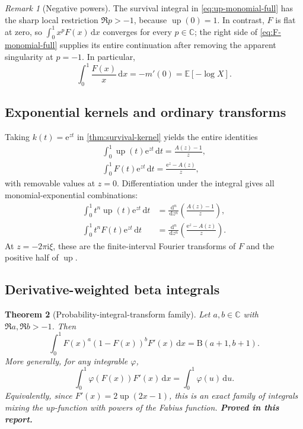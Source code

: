 \documentclass[11pt,oneside]{article}
\numberwithin{equation}{section}
\newtheorem{theorem}{Theorem}[section]
\theoremstyle{definition}
\theoremstyle{remark}
\newtheorem{remark}[theorem]{Remark}
\newcommand{\C}{\mathbb C}
\newcommand{\Up}{\operatorname{up}}
\newcommand{\e}{\mathrm e}
\newcommand{\ii}{\mathrm i}
\newcommand{\dd}{\,\mathrm d}
\newcommand{\E}{\mathbb E}
\newcommand{\statusproved}{\textcolor{proofgreen}{\textbf{Proved in this report.}}}
\begin{document}
\begin{remark}[Negative powers]
The survival integral in \eqref{eq:up-monomial-full} has the sharp local
restriction \(\Re p>-1\), because \(\Up(0)=1\).  In contrast, \(F\) is flat at
zero, so \(\int_0^1x^pF(x)\dd x\) converges for every \(p\in\C\); the right side
of \eqref{eq:F-monomial-full} supplies its entire continuation after removing
the apparent singularity at \(p=-1\).  In particular,
\begin{equation}
 \int_0^1\frac{F(x)}x\dd x=-m'(0)=\E[-\log X].
 \label{eq:F-over-x}
\end{equation}
\end{remark}

\subsection{Exponential kernels and ordinary transforms}

Taking \(k(t)=\e^{zt}\) in \cref{thm:survival-kernel} yields the entire
identities
\begin{align}
 \boxed{\int_0^1\Up(t)\e^{zt}\dd t=\frac{A(z)-1}{z},}
 \label{eq:up-exp-transform}\\
 \boxed{\int_0^1F(t)\e^{zt}\dd t=\frac{\e^z-A(z)}{z},}
 \label{eq:F-exp-transform}
\end{align}
with removable values at \(z=0\).  Differentiation under the integral gives all
monomial-exponential combinations:
\begin{align}
 \int_0^1t^n\Up(t)\e^{zt}\dd t
 &=\frac{\dd^n}{\dd z^n}\left(\frac{A(z)-1}{z}\right),
 \label{eq:up-monomial-exp}\\
 \int_0^1t^nF(t)\e^{zt}\dd t
 &=\frac{\dd^n}{\dd z^n}\left(\frac{\e^z-A(z)}{z}\right).
 \label{eq:F-monomial-exp}
\end{align}
At \(z=-2\pi\ii\xi\), these are the finite-interval Fourier transforms of
\(F\) and the positive half of \(\Up\).

\subsection{Derivative-weighted beta integrals}

\begin{theorem}[Probability-integral-transform family]
\label{thm:beta-family}
Let \(a,b\in\C\) with \(\Re a,\Re b>-1\).  Then
\begin{equation}
 \boxed{\int_0^1 F(x)^a(1-F(x))^bF'(x)\dd x
 =\mathrm B(a+1,b+1).}
 \label{eq:F-beta}
\end{equation}
More generally, for any integrable \(\varphi\),
\begin{equation}
 \int_0^1\varphi(F(x))F'(x)\dd x=\int_0^1\varphi(u)\dd u.
 \label{eq:PIT}
\end{equation}
Equivalently, since \(F'(x)=2\Up(2x-1)\), this is an exact family of integrals
mixing the up-function with powers of the Fabius function.  \statusproved
\end{theorem}
\end{document}
